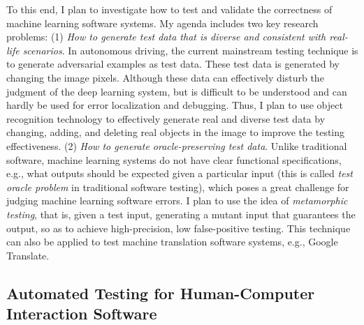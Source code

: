 \documentclass[a4paper]{article}
\begin{document}
To this end, I plan to investigate how to test and validate the correctness of machine learning software systems. 
My agenda includes two key research problems: (1) \emph{How to generate test data that is diverse and consistent with real-life scenarios}.
In autonomous driving, the current mainstream testing technique is to generate adversarial examples as test data. These test data is generated by changing the image pixels. Although these data can effectively disturb the judgment of the deep learning system, but is difficult to be understood and can hardly be used for error localization and debugging. 
Thus, I plan to use object recognition technology to effectively generate real and diverse test data by changing, adding, and deleting real objects in the image to improve the testing effectiveness.
(2) \emph{How to generate oracle-preserving test data}. Unlike traditional software, machine learning systems do not have clear functional specifications, e.g., what outputs should be expected given a particular input (this is called \emph{test oracle problem} in traditional software testing), which poses a great challenge for judging machine learning software errors. I plan to use the idea of \emph{metamorphic testing}, that is, given a test input, generating a mutant input that guarantees the output, so as to achieve high-precision, low false-positive testing. 
This technique can also be applied to test machine translation software systems, e.g., Google Translate.


\subsection{Automated Testing for Human-Computer Interaction Software}
\end{document}
